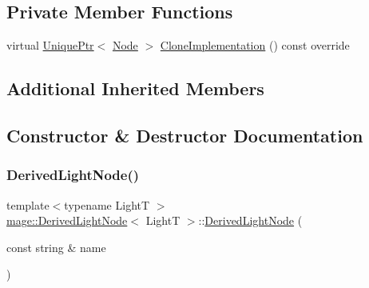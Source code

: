 \subsection*{Private Member Functions}
\begin{DoxyCompactItemize}
\item 
virtual \hyperlink{namespacemage_a8c307fbcc33bce9b7f2aa4c26c3b95cf}{Unique\+Ptr}$<$ \hyperlink{classmage_1_1_node}{Node} $>$ \hyperlink{classmage_1_1_derived_light_node_acf8858989780bf45a45c55a7c5564314}{Clone\+Implementation} () const override
\end{DoxyCompactItemize}
\subsection*{Additional Inherited Members}


\subsection{Constructor \& Destructor Documentation}
\hypertarget{classmage_1_1_derived_light_node_adfbc8827ef96abbf17a73f070d4be4b6}{}\label{classmage_1_1_derived_light_node_adfbc8827ef96abbf17a73f070d4be4b6} 
\subsubsection{\texorpdfstring{Derived\+Light\+Node()}{DerivedLightNode()}\hspace{0.1cm}{\footnotesize\ttfamily [1/4]}}
{\footnotesize\ttfamily template$<$typename LightT $>$ \\
\hyperlink{classmage_1_1_derived_light_node}{mage\+::\+Derived\+Light\+Node}$<$ LightT $>$\+::\hyperlink{classmage_1_1_derived_light_node}{Derived\+Light\+Node} (\begin{DoxyParamCaption}\item[{const string \&}]{name }\end{DoxyParamCaption})\hspace{0.3cm}{\ttfamily [explicit]}}

\hypertarget{classmage_1_1_derived_light_node_ab3e68ce3299581459843e8ad12f18464}{}\label{classmage_1_1_derived_light_node_ab3e68ce3299581459843e8ad12f18464} 
